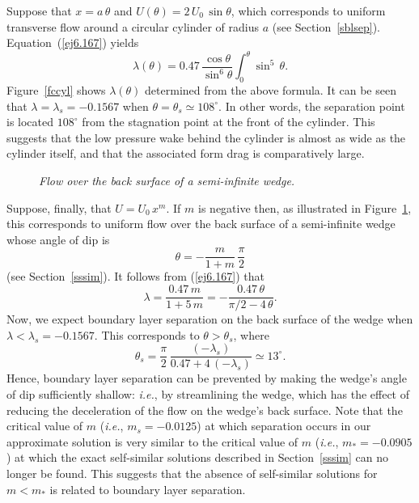 Suppose that $x=a\,\theta$ and $U(\theta)=2\,U_0\,\sin\theta$, which corresponds to uniform transverse flow around a circular cylinder of radius $a$ (see Section~\ref{sblsep}). Equation~(\ref{ej6.167}) yields
\begin{equation}
\lambda(\theta) = 0.47\,\frac{\cos\theta}{\sin^6\theta}\int_0^\theta \sin^5\,\theta.
\end{equation}
Figure~\ref{fccyl} shows $\lambda(\theta)$ determined from the above formula. It can be seen that $\lambda=\lambda_s=-0.1567$
when $\theta=\theta_s\simeq 108^\circ$. In other words, the separation point is located $108^\circ$ from the stagnation point at
the front of the cylinder. This suggests that the low pressure wake behind the cylinder is almost as wide as the
cylinder itself, and that the associated form drag is comparatively large.

\begin{figure}
\epsfysize=1.5in
\centerline{}
\caption{\em Flow over the back surface of a semi-infinite wedge.}\label{fwedgex}
\end{figure}

Suppose, finally, that $U=U_0\,x^m$. If $m$ is negative then, as illustrated in Figure~\ref{fwedgex},  this corresponds to uniform flow over the back surface of a semi-infinite
wedge whose angle of dip is 
\begin{equation}
\theta = - \frac{m}{1+m}\,\frac{\pi}{2}
\end{equation}
(see Section~\ref{sssim}).
It follows from (\ref{ej6.167}) that
\begin{equation}
\lambda = \frac{0.47\,m}{1+5\,m} = -\frac{0.47\,\theta}{\pi/2-4\,\theta}.
\end{equation}
Now, we expect boundary layer separation on the back surface of the wedge  when $\lambda<\lambda_s=-0.1567$. This corresponds to $\theta>\theta_s$, where
\begin{equation}
\theta_s = \frac{\pi}{2}\,\frac{(-\lambda_s)}{0.47+4\,(-\lambda_s)} \simeq 13^\circ.
\end{equation}
Hence, boundary layer separation can be prevented by making the wedge's angle of
dip sufficiently shallow: {\em i.e.}, by streamlining the wedge, which has the effect of reducing the deceleration of the
flow on the wedge's back surface. 
Note that the critical value of $m$  ({\em i.e.}, $m_s=-0.0125$) at which separation occurs in our approximate solution is
very similar to the critical value of $m$ ({\em i.e.}, $m_\ast=-0.0905$) at which the exact self-similar solutions described in Section~\ref{sssim}
can no longer be found. This suggests that the absence of self-similar solutions for $m<m_\ast$ is related to
boundary layer separation. 

